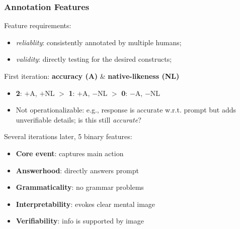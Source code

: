 \documentclass[handout,xcolor={dvipsnames}]{beamer}
\begin{document}
\begin{frame}
\frametitle{Annotation Features}
\pause
Feature requirements:
\begin{itemize}
\pause
\item \textit{reliablity}: consistently annotated by multiple humans;
\pause
\item \textit{validity}: directly testing for the desired constructs;
\end{itemize}
\pause
First iteration: \textbf{accuracy (A)} \& \textbf{native-likeness (NL)}
\begin{itemize}
\pause
\item \textbf{2}: $+$A, $+$NL $>$ \textbf{1}: $+$A, $-$NL $>$ \textbf{0}: $-$A, $-$NL
\pause
\item Not operationalizable: e.g., response is accurate w.r.t. prompt but adds unverifiable details; is this still \textit{accurate}?
\end{itemize}
\pause
Several iterations later, 5 binary features:
\begin{itemize}
\pause
\item \textbf{Core event}: \pause captures main action
\pause
\item \textbf{Answerhood}: \pause directly answers prompt
\pause
\item \textbf{Grammaticality}: \pause no grammar problems
\pause
\item \textbf{Interpretability}: \pause evokes clear mental image
\pause
\item \textbf{Verifiability}: \pause info is supported by image
\end{itemize}


\end{frame}
\end{document}
